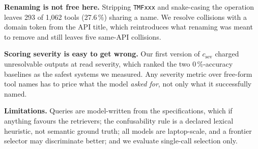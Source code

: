 \textbf{Renaming is not free here.} Stripping \texttt{TMFxxx} and snake-casing
the operation leaves 293 of 1,062 tools (27.6\,\%) sharing a name. We resolve
collisions with a domain token from the API title, which reintroduces what
renaming was meant to remove and still leaves five same-API collisions.

\textbf{Scoring severity is easy to get wrong.} Our first version of
$c_{\mathrm{sev}}$ charged unresolvable outputs at read severity, which ranked
the two 0\,\%-accuracy baselines as the safest systems we measured. Any
severity metric over free-form tool names has to price what the model
\emph{asked for}, not only what it successfully named.

\textbf{Limitations.} Queries are model-written from the specifications, which
if anything favours the retrievers; the confusability rule is a declared
lexical heuristic, not semantic ground truth; all models are laptop-scale, and
a frontier selector may discriminate better; and we evaluate single-call
selection only.



